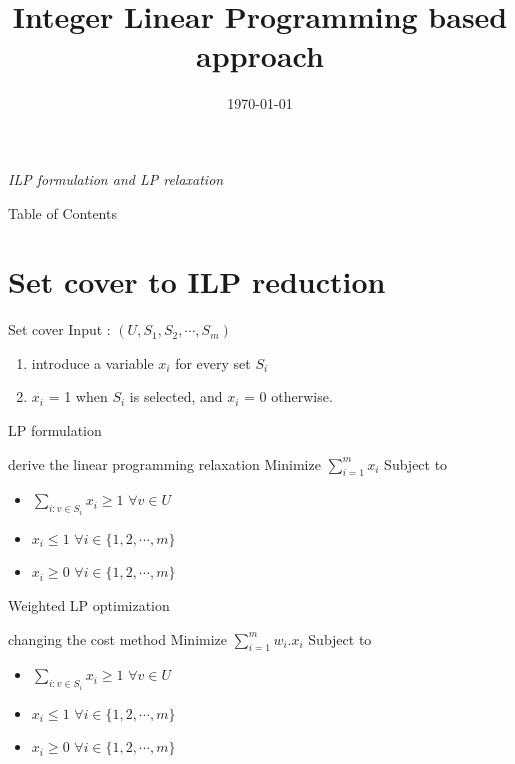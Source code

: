 \documentclass[24pt,pdf,xcolor=table]{beamer}
\title{Integer Linear Programming based approach}
\date{\today}
\begin{document}
	
\begin{frame}{\textit{ILP formulation and LP relaxation}}
	\titlepage
\end{frame}
	
\begin{frame}{Table of Contents}
	\tableofcontents
\end{frame}
	
\section{Set cover to ILP reduction}
\begin{frame}
  \begin{block}{Set cover}
    Input : $(U, S_1, S_2, \cdots, S_m)$
  \end{block}
  
  \begin{enumerate}
    \item introduce a variable $x_i$ for every set $S_i$
    \item $x_i$ = 1 when $S_i$ is selected, and $x_i$ = 0 otherwise.
  \end{enumerate}
\end{frame}


\begin{frame}{LP formulation}
	\begin{block}{derive the linear programming relaxation}
	  Minimize $\sum_{i = 1}^m x_i$
	  \newline Subject to 
	  \begin{itemize}
	    \item $\sum_{i:v \in S_i} x_i \ge 1$       $\forall v\in U$
	    \item $x_i \le 1$   $\forall i\in \{1, 2, \cdots, m\}$
	    \item $x_i \ge 0$   $\forall i\in \{1, 2, \cdots, m\}$
	  \end{itemize}
	\end{block}
\end{frame}	

\begin{frame}{Weighted LP optimization}
	\begin{block}{changing the cost method}
	  Minimize $\sum_{i = 1}^m w_i.x_i$
	  \newline Subject to 
	  \begin{itemize}
	    \item $\sum_{i:v \in S_i} x_i \ge 1$       $\forall v\in U$
	    \item $x_i \le 1$   $\forall i\in \{1, 2, \cdots, m\}$
	    \item $x_i \ge 0$   $\forall i\in \{1, 2, \cdots, m\}$
	  \end{itemize}
	\end{block}
\end{frame}	
\end{document}
